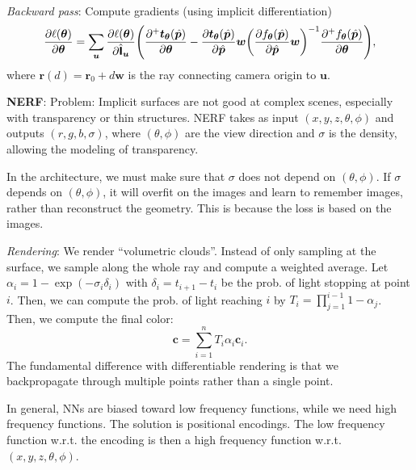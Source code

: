 \documentclass{article}
\newcommand{\lft}{\mathopen{}\mathclose\bgroup\left}
\newcommand{\rgt}{\aftergroup\egroup\right}
\renewcommand{\vec}[1]{\bm{#1}}
\newcommand{\tens}[1]{\bm{\mathsf{#1}}}
\newenvironment{topic}[1]
{\textbf{\sffamily \colorbox{black}{\rlap{\textbf{\textcolor{white}{#1}}}\hspace{\linewidth}\hspace{-2\fboxsep}}} \\ \vspace{0.2cm}}
{}
\begin{document}
\begin{multicols*}{2}
\begin{topic}{Implicit surfaces and neural radiance fields}
        \textit{Backward pass}: Compute gradients (using implicit differentiation) \[
            \pdv{\ell(\vec{\theta})}{\vec{\theta}} = \sum_{\vec{u}} \pdv{\ell(\vec{\theta})}{\hat{\tens{I}}_{\vec{u}}} \lft( \pdv{^+ \vec{t}_{\vec{\theta}}(\hat{\vec{p}})}{\vec{\theta}} - \pdv{\vec{t}_{\vec{\theta}}(\hat{\vec{p}})}{\hat{\vec{p}}} \vec{w} \lft( \pdv{f_{\vec{\theta}}(\hat{\vec{p}})}{\hat{\vec{p}}} \vec{w} \rgt)^{-1} \pdv{^+ f_{\vec{\theta}}(\hat{\vec{p}})}{\vec{\theta}} \rgt),
        \]
        where $\vec{r}(d) = \vec{r}_0 + d \vec{w}$ is the ray connecting camera origin to $\vec{u}$.

        \textbf{NERF}: Problem: Implicit surfaces are not good at complex scenes, especially with
        transparency or thin structures. NERF takes as input $(x,y,z,\theta,\phi)$ and outputs
        $(r,g,b,\sigma)$, where $(\theta,\phi)$ are the view direction and $\sigma$ is the density,
        allowing the modeling of transparency.

        In the architecture, we must make sure that $\sigma$ does not depend on $(\theta,\phi)$. If
        $\sigma$ depends on $(\theta,\phi)$, it will overfit on the images and learn to remember images,
        rather than reconstruct the geometry. This is because the loss is based on the images.

        \textit{Rendering}: We render ``volumetric clouds''. Instead of only sampling at the surface, we sample
        along the whole ray and compute a weighted average. Let $\alpha_i = 1 - \exp(-\sigma_i \delta_i)$
        with $\delta_i = t_{i+1} - t_i$ be the prob. of light stopping at point $i$. Then, we can compute
        the prob. of light reaching $i$ by $T_i = \prod_{j=1}^{i-1} 1 - \alpha_j$. Then, we compute
        the final color: \[
            \vec{c} = \sum_{i=1}^{n} T_i \alpha_i \vec{c}_i.
        \]
        The fundamental difference with differentiable rendering is that we backpropagate through multiple
        points rather than a single point.

        In general, NNs are biased toward low frequency functions, while we need high frequency functions.
        The solution is positional encodings. The low frequency function w.r.t. the encoding is then a high
        frequency function w.r.t. $(x,y,z,\theta,\phi)$.


\end{topic}
\end{multicols*}
\end{document}
